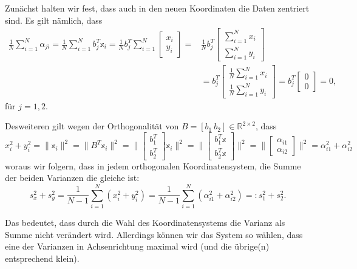 \documentclass[]{book}
\theoremstyle{definition}
\theoremstyle{definition}
\theoremstyle{definition}
\theoremstyle{definition}
\theoremstyle{remark}
\begin{document}
Zunächst halten wir fest, dass auch in den neuen Koordinaten die Daten zentriert sind. Es gilt nämlich, dass
\begin{align*}
\frac 1N \sum_{i=1}^N \alpha_{ji}=\frac 1N \sum_{i=1}^N b_j^T\mathbb x_i 
=\frac 1N b_j^T \sum_{i=1}^N \begin{bmatrix} x_i \\ y_i \end{bmatrix}
=& \frac 1N b_j^T \begin{bmatrix} \sum_{i=1}^N x_i \\ \sum_{i=1}^N y_i \end{bmatrix}\\
&=b_j^T \begin{bmatrix} \frac 1N \sum_{i=1}^N x_i \\ \frac 1N \sum_{i=1}^N y_i \end{bmatrix}
=b_j^T \begin{bmatrix} 0 \\ 0 \end{bmatrix} = 0,
\end{align*}
für \(j=1,2\).

Desweiteren gilt wegen der Orthogonalität von \(B=[b_1~b_2]\in \mathbb R^{2\times 2}\), dass
\begin{equation*}
x_{i}^2 + y_{i}^2 = \|\mathbb x_i\|^2 = \|B^T\mathbb x_i\|^2 
= \|\begin{bmatrix} b_1^T \\ b_2^T \end{bmatrix} \mathbb x_i\|^2
= \|\begin{bmatrix} b_1^T\mathbb x \\ b_2^T\mathbb x \end{bmatrix}\|^2
= \|\begin{bmatrix} \alpha_{i1} \\ \alpha_{i2} \end{bmatrix}\|^2
= \alpha_{i1}^2 + \alpha_{i2}^2
\end{equation*}
woraus wir folgern, dass in jedem orthogonalen Koordinatensystem, die Summe der beiden Varianzen die gleiche ist:
\begin{equation*}
s_x^2 + s_y^2 = \frac{1}{N-1}\sum_{i=1}^N(x_i^2 + y_i^2) = \frac{1}{N-1}\sum_{i=1}^N(\alpha_{i1}^2 + \alpha_{i2}^2) =: s_1^2 + s_2^2.
\end{equation*}

Das bedeutet, dass durch die Wahl des Koordinatensystems die Varianz als Summe nicht verändert wird. Allerdings können wir das System so wählen, dass eine der Varianzen in Achsenrichtung maximal wird (und die übrige(n) entsprechend klein).
\end{document}

